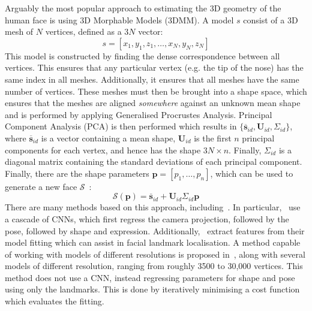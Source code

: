 Arguably the most popular approach to estimating the 3D geometry of
the human face is using 3D Morphable Models (3DMM). A model $s$
consist of a 3D mesh of $N$ vertices, defined as a $3N$ vector:
%
\begin{equation}
  s = [x_1, y_1, z_1, \dots, x_N, y_N, z_N]
\end{equation}
%
This model is constructed by finding the dense correspondence between
all vertices. This ensures that any particular vertex (e.g. the tip of
the nose) has the same index in all meshes. Additionally, it ensures
that all meshes have the same number of vertices. These meshes must
then be brought into a shape space, which ensures that the meshes are
aligned \textit{somewhere} against an unknown mean shape and is
performed by applying Generalised Procrustes Analysis. Principal
Component Analysis (PCA) is then performed which results in
$\{\boldsymbol{\overline{s}}_{id}, \boldsymbol{U}_{id},
\Sigma_{id}\}$, where $\boldsymbol{\overline{s}}_{id}$ is a vector
containing a mean shape, $\boldsymbol{U}_{id}$ is the first $n$
principal components for each vertex, and hence has the shape
$3N \times n$. Finally, $\Sigma_{id}$ is a diagonal matrix containing
the standard deviations of each principal component. Finally, there
are the shape parameters $\boldsymbol{p} = [p_1, \dots, p_n]$, which
can be used to generate a new face $\mathcal{S}$~\cite{booth20183d}:
%
\begin{equation}
  \mathcal{S}(\boldsymbol{p}) = \boldsymbol{\overline{s}}_{id}
  + \boldsymbol{U}_{id}\Sigma_{id}\boldsymbol{p}
\end{equation}
%
There are many methods based on this approach,
including~\cite{jourabloo2016large,huber2016multiresolution,zhu2016face,liu2016joint,tran2018extreme,jiang20183d,jiang2018pose}. In
particular,~\cite{jourabloo2016large} use a cascade of CNNs, which
first regress the camera projection, followed by the pose, followed by
shape and expression. Additionally,~\cite{jourabloo2016large} extract
features from their model fitting which can assist in facial landmark
localisation. A method capable of working with models of different
resolutions is proposed in~\cite{huber2016multiresolution}, along with
several models of different resolution, ranging from roughly 3500 to
30,000 vertices. This method does not use a CNN, instead regressing
parameters for shape and pose using only the landmarks. This is done
by iteratively minimising a cost function which evaluates the fitting.

